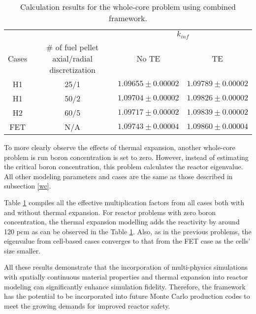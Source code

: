 \begin{table}
    \centering
    \caption{Calculation results for the whole-core problem using combined framework.}
    \label{tab432} 
    \begin{tabular}{| c | c | c | c | }
    \hline 
       &   & \multicolumn{2}{c|}{$k_{inf}$}       \\
    \cline{3-4}
     Cases & \# of fuel pellet axial/radial discretization & No TE & TE \\
     \hline
     H1     & 25/1  & $1.09655\pm0.00002$ & $1.09789\pm0.00002$      \\ \hline
     H1     & 50/2  & $1.09704\pm0.00002$ & $1.09826\pm0.00002$      \\ \hline
     H2     & 60/5  & $1.09717\pm0.00002$ & $1.09839\pm0.00002$      \\ \hline
     FET    & N/A   & $1.09743\pm0.00004$ & $1.09860\pm0.00004$      \\ \hline
    \end{tabular}
\end{table}

To more clearly observe the effects of thermal expansion, another whole-core problem is run boron concentration is set to zero. However, instead of estimating the critical boron concentration, this problem calculates the reactor eigenvalue. All other modeling parameters and cases are the same as those described in subsection \ref{wc}.

Table \ref{tab432} compiles all the effective multiplication factors from all cases both with and without thermal expansion. For reactor problems with zero boron concentration, the thermal expansion modelling adds the reactivity by around 120 pcm as can be observed in the Table \ref{tab432}. Also, as in the previous problems, the eigenvalue from cell-based cases converges to that from the FET case as the cells' size smaller.

All these results demonstrate that the incorporation of multi-physics simulations with spatially continuous material properties and thermal expansion into reactor modeling can significantly enhance simulation fidelity. Therefore, the framework has the potential to be incorporated into future Monte Carlo production codes to meet the growing demands for improved reactor safety.